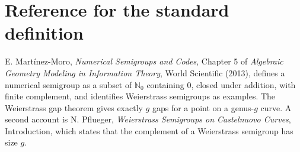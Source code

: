 \documentclass[11pt]{article}
\begin{document}
\section*{Reference for the standard definition}
E. Mart\'inez-Moro, \emph{Numerical Semigroups and Codes}, Chapter 5 of \emph{Algebraic Geometry Modeling in Information Theory}, World Scientific (2013), defines a numerical semigroup as a subset of $\mathbb N_0$ containing $0$, closed under addition, with finite complement, and identifies Weierstrass semigroups as examples. The Weierstrass gap theorem gives exactly $g$ gaps for a point on a genus-$g$ curve. A second account is N. Pflueger, \emph{Weierstrass Semigroups on Castelnuovo Curves}, Introduction, which states that the complement of a Weierstrass semigroup has size $g$.
\end{document}
